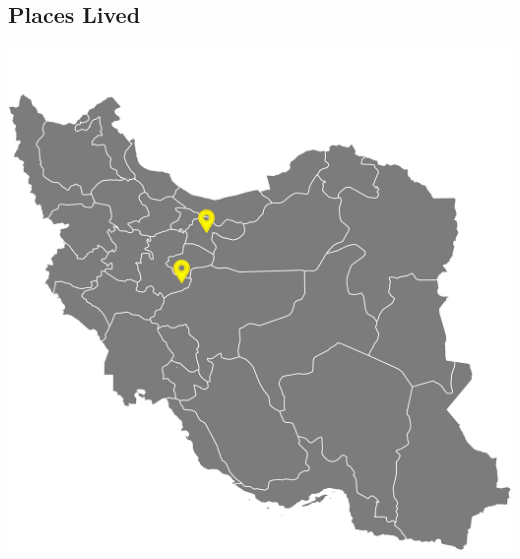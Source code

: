 \documentclass[a4paper]{friggeri-cv}
\begin{document}
\begin{aside}
        \section{Places Lived}\label{sec:places-lived}
        \includegraphics[scale=0.5]{../assets/images/iran.png}
        ~
    \end{aside}
    ~
\end{document}
